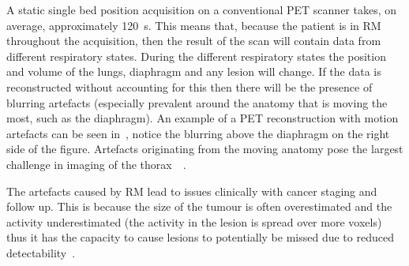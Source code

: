             A static single bed position acquisition on a conventional \gls{PET} scanner takes, on average, approximately \SI{120}{\second}. This means that, because the patient is in \gls{RM} throughout the acquisition, then the result of the scan will contain data from different respiratory states. During the different respiratory states the position and volume of the lungs, diaphragm and any lesion will change. If the data is reconstructed without accounting for this then there will be the presence of blurring artefacts (especially prevalent around the anatomy that is moving the most, such as the diaphragm). %
            An example of a \gls{PET} reconstruction with motion artefacts can be seen in~, notice the blurring above the diaphragm on the right side of the figure. Artefacts originating from the moving anatomy pose the largest challenge in imaging of the thorax~~.
            
            The artefacts caused by \gls{RM} lead to issues clinically with cancer staging and follow up. This is because the size of the tumour is often overestimated and the activity underestimated (the activity in the lesion is spread over more voxels) thus it has the capacity to cause lesions to potentially be missed due to reduced detectability~. %
            
